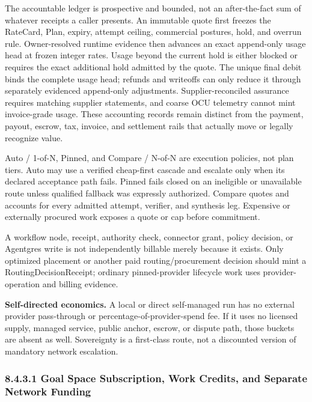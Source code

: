 \documentclass[
  11pt,
]{article}
\begin{document}
The accountable ledger is prospective and bounded, not an after-the-fact sum
of whatever receipts a caller presents. An immutable quote first freezes the
RateCard, Plan, expiry, attempt ceiling, commercial postures, hold, and overrun
rule. Owner-resolved runtime evidence then advances an exact append-only usage
head at frozen integer rates. Usage beyond the current hold is either blocked
or requires the exact additional hold admitted by the quote. The unique final
debit binds the complete usage head; refunds and writeoffs can only reduce it
through separately evidenced append-only adjustments. Supplier-reconciled
assurance requires matching supplier statements, and coarse OCU telemetry
cannot mint invoice-grade usage. These accounting records remain distinct from
the payment, payout, escrow, tax, invoice, and settlement rails that actually
move or legally recognize value.

Auto / 1-of-N, Pinned, and Compare / N-of-N are execution policies, not
plan tiers. Auto may use a verified cheap-first cascade and escalate only
when its declared acceptance path fails. Pinned fails closed on an
ineligible or unavailable route unless qualified fallback was expressly
authorized. Compare quotes and accounts for every admitted attempt,
verifier, and synthesis leg. Expensive or externally procured work exposes
a quote or cap before commitment.

A workflow node, receipt, authority check, connector grant, policy decision,
or Agentgres write is not independently billable merely because it exists.
Only optimized placement or another paid routing/procurement decision should
mint a RoutingDecisionReceipt; ordinary pinned-provider lifecycle work uses
provider-operation and billing evidence.

\textbf{Self-directed economics.} A local or direct self-managed run has no
external provider pass-through or percentage-of-provider-spend fee. If it
uses no licensed supply, managed service, public anchor, escrow, or dispute
path, those buckets are absent as well. Sovereignty is a first-class route,
not a discounted version of mandatory network escalation.\\

\hypertarget{goal-space-subscription-work-credits-and-separate-network-funding}{%
\subsubsection{8.4.3.1 Goal Space Subscription, Work Credits, and
Separate Network
Funding}\label{goal-space-subscription-work-credits-and-separate-network-funding}}
\end{document}
